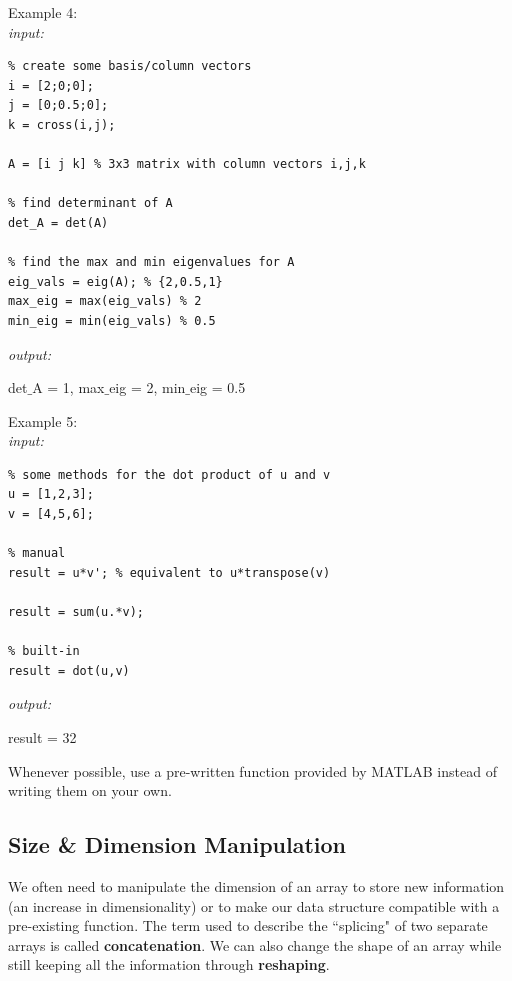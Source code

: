 \documentclass[../MATLAB_Primer.tex]{subfiles}
\begin{document}
Example 4:\\

\textit{input:}
\begin{lstlisting}
% create some basis/column vectors 
i = [2;0;0];
j = [0;0.5;0];
k = cross(i,j);

A = [i j k] % 3x3 matrix with column vectors i,j,k

% find determinant of A
det_A = det(A)

% find the max and min eigenvalues for A 
eig_vals = eig(A); % {2,0.5,1}
max_eig = max(eig_vals) % 2
min_eig = min(eig_vals) % 0.5
\end{lstlisting}
\textit{output:}\\

\begin{center}
    det$\_$A = 1,\quad
    max$\_$eig = 2,\quad
    min$\_$eig = 0.5
\end{center}

Example 5:\\

\textit{input:}
\begin{lstlisting}
% some methods for the dot product of u and v
u = [1,2,3];
v = [4,5,6];

% manual
result = u*v'; % equivalent to u*transpose(v)

result = sum(u.*v); 

% built-in
result = dot(u,v)
\end{lstlisting}
\textit{output:}\\

\begin{center}
    result = 32
\end{center}

Whenever possible, use a pre-written function provided by MATLAB instead of writing them on your own. 


\subsection{Size \& Dimension Manipulation} 
We often need to manipulate the dimension of an array to store new information (an increase in dimensionality) or to make our data structure compatible with a pre-existing function.  The term used to describe the ``splicing" of two separate arrays is called \textbf{concatenation}. We can also change the shape of an array while still keeping all the information through \textbf{reshaping}.
\end{document}
